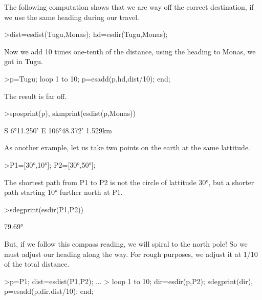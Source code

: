 \documentclass{article}
\begin{document}
\begin{eulernotebook}
\begin{eulercomment}
\begin{eulercomment}
\begin{eulercomment}
\begin{eulercomment}
\begin{eulercomment}
\begin{eulercomment}
\begin{eulercomment}
\begin{eulercomment}
\begin{eulercomment}
The following computation shows that we are way off the correct
destination, if we use the same heading during our travel.
\end{eulercomment}
\begin{eulerprompt}
>dist=esdist(Tugu,Monas); hd=esdir(Tugu,Monas);
\end{eulerprompt}
\begin{eulercomment}
Now we add 10 times one-tenth of the distance, using the heading to Monas, we got in Tugu.
\end{eulercomment}
\begin{eulerprompt}
>p=Tugu; loop 1 to 10; p=esadd(p,hd,dist/10); end;
\end{eulerprompt}
\begin{eulercomment}
The result is far off.
\end{eulercomment}
\begin{eulerprompt}
>sposprint(p), skmprint(esdist(p,Monas))
\end{eulerprompt}
\begin{euleroutput}
  S 6°11.250' E 106°48.372'
       1.529km
\end{euleroutput}
\begin{eulercomment}
As another example, let us take two points on the earth at the same
lattitude.
\end{eulercomment}
\begin{eulerprompt}
>P1=[30°,10°]; P2=[30°,50°];
\end{eulerprompt}
\begin{eulercomment}
The shortest path from P1 to P2 is not the circle of lattitude 30°,
but a shorter path starting 10° further north at P1.
\end{eulercomment}
\begin{eulerprompt}
>sdegprint(esdir(P1,P2))
\end{eulerprompt}
\begin{euleroutput}
       79.69°
\end{euleroutput}
\begin{eulercomment}
But, if we follow this compass reading, we will spiral to the north
pole! So we must adjust our heading along the way. For rough purposes,
we adjust it at 1/10 of the total distance.
\end{eulercomment}
\begin{eulerprompt}
>p=P1;  dist=esdist(P1,P2); ...
>  loop 1 to 10; dir=esdir(p,P2); sdegprint(dir), p=esadd(p,dir,dist/10); end;
\end{eulerprompt}
\begin{euleroutput}

\end{euleroutput}
\end{eulercomment}
\end{eulercomment}
\end{eulercomment}
\end{eulercomment}
\end{eulercomment}
\end{eulercomment}
\end{eulercomment}
\end{eulercomment}
\end{eulernotebook}
\end{document}
